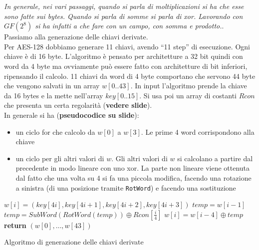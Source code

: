 \documentclass[a4paper,12pt, oneside]{book}
\begin{document}
\textit{In generale, nei vari passaggi, quando si parla di moltiplicazioni si ha
  che esse sono fatte sui bytes. Quando si parla di somme si parla di
  xor. Lavorando con $GF(2^8)$ si ha infatti a che fare con un campo, con somma
  e prodotto.}.\\
Passiamo alla generazione delle chiavi derivate.\\
Per AES-128 dobbiamo generare 11 chiavi, avendo ``11 step'' di esecuzione. Ogni
chiave è di 16 byte. L'algoritmo è pensato per architetture a 32 bit quindi con
word da 4 byte ma ovviamente può essere fatto con architetture di bit inferiori,
ripensando il calcolo. 11 chiavi da word di 4 byte comportano che servono 44
byte che vengono salvati in un array $w[0..43]$. In input l'algoritmo prende la
chiave da 16 bytes e la mette nell'array $key[0..15]$. Si usa poi un array di
costanti $Rcon$ che presenta un certa regolarità (\textbf{vedere slide}).\\
In generale si ha (\textbf{pseudocodice su slide}):
\begin{itemize}
  \item un ciclo for che calcolo da $w[0]$ a $w[3]$. Le prime 4 word
  corrispondono alla chiave
  \item un ciclo per gli altri valori di $w$. Gli altri valori di $w$ si
  calcolano a partire dal precedente in modo lineare con uno xor. La parte non
  lineare viene ottenuta dal fatto che una volta su 4 si fa una piccola
  modifica, facendo una rotazione a sinistra (di una posizione tramite
  \texttt{RotWord}) e facendo una sostituzione
\end{itemize}
\begin{algorithm}
  \begin{algorithmic}
    \State $w[i]=(key[4i],key[4i+1],key[4i+2],key[4i+3])$
    \EndFor
    \State $temp=w[i-1]$
    \State $temp=SubWord(RotWord(temp))\oplus Rcon\left[\frac{i}{4}\right]$
    \EndIf
    \State $w[i]=w[i-4]\oplus temp$
    \EndFor
    \State \textbf{return} $(w[0],\ldots, w[43])$
    \EndFunction
  \end{algorithmic}
  \caption{Algoritmo di generazione delle chiavi derivate}
\end{algorithm}
\end{document}

